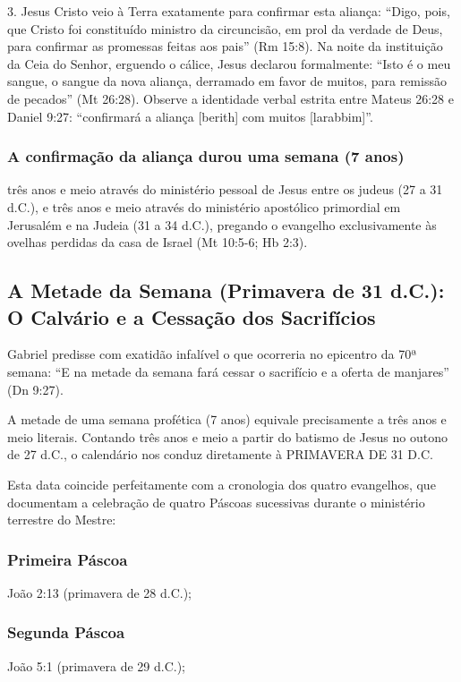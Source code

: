 3. Jesus Cristo veio à Terra exatamente para confirmar esta aliança: ``Digo, pois, que Cristo foi constituído ministro da circuncisão, em prol da verdade de Deus, para confirmar as promessas feitas aos pais'' (Rm 15:8). Na noite da instituição da Ceia do Senhor, erguendo o cálice, Jesus declarou formalmente: ``Isto é o meu sangue, o sangue da nova aliança, derramado em favor de muitos, para remissão de pecados'' (Mt 26:28). Observe a identidade verbal estrita entre Mateus 26:28 e Daniel 9:27: ``confirmará a aliança [berith] com muitos [larabbim]''.

\subsubsection*{A confirmação da aliança durou uma semana (7 anos)}
três anos e meio através do ministério pessoal de Jesus entre os judeus (27 a 31 d.C.), e três anos e meio através do ministério apostólico primordial em Jerusalém e na Judeia (31 a 34 d.C.), pregando o evangelho exclusivamente às ovelhas perdidas da casa de Israel (Mt 10:5-6; Hb 2:3).



\subsection{A Metade da Semana (Primavera de 31 d.C.): O Calvário e a Cessação dos Sacrifícios}


Gabriel predisse com exatidão infalível o que ocorreria no epicentro da 70ª semana:
``E na metade da semana fará cessar o sacrifício e a oferta de manjares'' (Dn 9:27).

A metade de uma semana profética (7 anos) equivale precisamente a três anos e meio literais. Contando três anos e meio a partir do batismo de Jesus no outono de 27 d.C., o calendário nos conduz diretamente à PRIMAVERA DE 31 D.C.

Esta data coincide perfeitamente com a cronologia dos quatro evangelhos, que documentam a celebração de quatro Páscoas sucessivas durante o ministério terrestre do Mestre:

\subsubsection*{Primeira Páscoa}
João 2:13 (primavera de 28 d.C.);

\subsubsection*{Segunda Páscoa}
João 5:1 (primavera de 29 d.C.);

